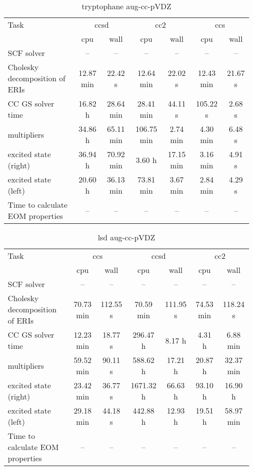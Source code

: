 \documentclass{article}
\begin{document}
\begin{table}
\caption{tryptophane aug-cc-pVDZ}
\begin{tabular}{lcccccc}
\toprule
Task & \multicolumn{2}{c}{ccsd} & \multicolumn{2}{c}{cc2} & \multicolumn{2}{c}{ccs}\\
\cmidrule(lr){2-3}\cmidrule(lr){4-5}\cmidrule(lr){6-7}
 & cpu & wall & cpu & wall & cpu & wall\\
\midrule
SCF solver & -- & -- & -- & -- & -- & --\\
Cholesky decomposition of ERIs & 12.87 min & 22.42 s & 12.64 min & 22.02 s & 12.43 min & 21.67 s\\
CC GS solver time & 16.82 h & 28.64 min & 28.41 min & 44.11 s & 105.22 s & 2.68 s\\
multipliers & 34.86 h & 65.11 min & 106.75 min & 2.74 min & 4.30 min & 6.48 s\\
excited state (right) & 36.94 h & 70.92 min & 3.60 h & 17.15 min & 3.16 min & 4.91 s\\
excited state (left) & 20.60 h & 36.13 min & 73.81 min & 3.67 min & 2.84 min & 4.29 s\\
Time to calculate EOM properties & -- & -- & -- & -- & -- & --\\
\bottomrule
\end{tabular}
\end{table}
\begin{table}
\caption{lsd aug-cc-pVDZ}
\begin{tabular}{lcccccc}
\toprule
Task & \multicolumn{2}{c}{ccs} & \multicolumn{2}{c}{ccsd} & \multicolumn{2}{c}{cc2}\\
\cmidrule(lr){2-3}\cmidrule(lr){4-5}\cmidrule(lr){6-7}
 & cpu & wall & cpu & wall & cpu & wall\\
\midrule
SCF solver & -- & -- & -- & -- & -- & --\\
Cholesky decomposition of ERIs & 70.73 min & 112.55 s & 70.59 min & 111.95 s & 74.53 min & 118.24 s\\
CC GS solver time & 12.23 min & 18.77 s & 296.47 h & 8.17 h & 4.31 h & 6.88 min\\
multipliers & 59.52 min & 90.11 s & 588.62 h & 17.21 h & 20.87 h & 32.37 min\\
excited state (right) & 23.42 min & 36.77 s & 1671.32 h & 66.63 h & 93.10 h & 16.90 h\\
excited state (left) & 29.18 min & 44.18 s & 442.88 h & 12.93 h & 19.51 h & 58.97 min\\
Time to calculate EOM properties & -- & -- & -- & -- & -- & --\\
\bottomrule
\end{tabular}
\end{table}
\end{document}
